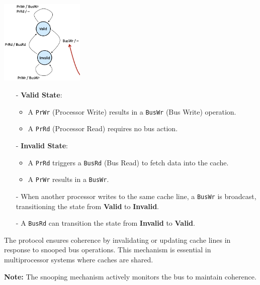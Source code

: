 \begin{center}
    \includegraphics[width=0.3\textwidth]{chapters/chapter5a/images/basic.png}
\end{center}
\begin{itemize}
    \item[-] \textbf{Valid State}:
        \begin{itemize}
            \item A \texttt{PrWr} (Processor Write) results in a \texttt{BusWr} (Bus Write) operation.
            \item A \texttt{PrRd} (Processor Read) requires no bus action.
        \end{itemize}
    \item[-] \textbf{Invalid State}:
        \begin{itemize}
            \item A \texttt{PrRd} triggers a \texttt{BusRd} (Bus Read) to fetch data into the cache.
            \item A \texttt{PrWr} results in a \texttt{BusWr}.
        \end{itemize}
    \item[-] When another processor writes to the same cache line, a \texttt{BusWr} is broadcast, transitioning the state from \textbf{Valid} to \textbf{Invalid}.
    \item[-] A \texttt{BusRd} can transition the state from \textbf{Invalid} to \textbf{Valid}.
\end{itemize}

The protocol ensures coherence by invalidating or updating cache lines in response to snooped bus operations. This mechanism is essential in multiprocessor systems where caches are shared.

\textbf{Note:} The snooping mechanism actively monitors the bus to maintain coherence.

